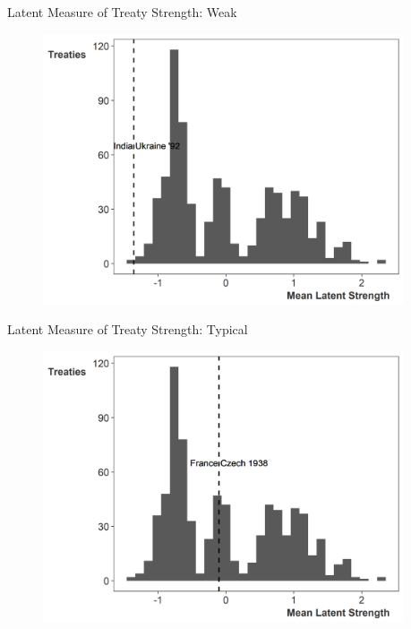 \documentclass{beamer}
\begin{document}

\begin{frame}{Latent Measure of Treaty Strength: Weak}

\begin{figure}[htbp]
	\centering
		\includegraphics[width=0.95\textwidth]{ls-hist-ukr-ind.png}
\end{figure}


\end{frame} 


\begin{frame}{Latent Measure of Treaty Strength: Typical}

\begin{figure}[htbp]
	\centering
		\includegraphics[width=0.95\textwidth]{ls-hist-fr-czech.png}
\end{figure}


\end{frame} 
\end{document}
